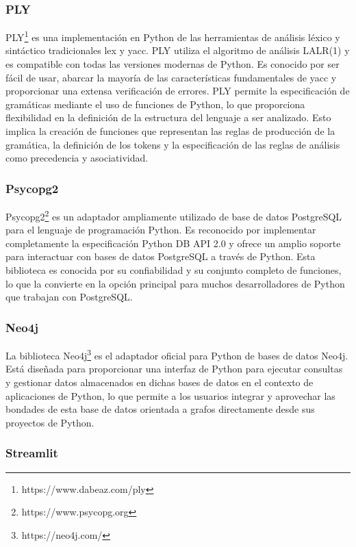 \subsubsection{PLY}

PLY\footnote{https://www.dabeaz.com/ply} es una implementación en Python de las 
herramientas de análisis léxico y sintáctico 
tradicionales lex y yacc. PLY utiliza el algoritmo de análisis LALR(1) y es 
compatible con todas las versiones modernas de Python. Es conocido por ser fácil de usar,
abarcar la mayoría de las características fundamentales de yacc y proporcionar una extensa verificación de errores. 
PLY permite la especificación de gramáticas 
mediante el uso de funciones de Python, lo que proporciona flexibilidad en la definición de la estructura del 
lenguaje a ser analizado. Esto implica la creación de funciones que representan las reglas de producción de la 
gramática, la definici\'on de los tokens y la especificación de las reglas de 
análisis como precedencia y asociatividad.

\subsubsection{Psycopg2}

Psycopg2\footnote{https://www.psycopg.org} es un adaptador ampliamente utilizado de base de datos PostgreSQL 
para el lenguaje de programación 
Python. Es reconocido por implementar completamente la especificación Python DB API 2.0 y ofrece un amplio 
soporte para interactuar con bases de datos PostgreSQL a través de Python. Esta biblioteca es conocida por 
su confiabilidad y su conjunto completo de funciones, lo que la convierte en la opción principal para muchos 
desarrolladores de Python que trabajan con PostgreSQL.

\subsubsection{Neo4j}

La biblioteca Neo4j\footnote{https://neo4j.com/} es el adaptador oficial para Python de bases de datos Neo4j. Está 
diseñada para proporcionar una 
interfaz de Python para ejecutar 
consultas y gestionar datos almacenados en dichas bases de datos en el contexto de aplicaciones de Python, lo que permite 
a los usuarios integrar y aprovechar las bondades de esta base de datos orientada a grafos directamente desde sus 
proyectos de Python.

\subsubsection{Streamlit}

